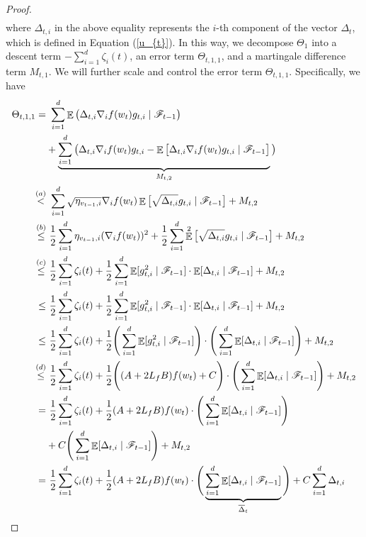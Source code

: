 \documentclass{article} %
\DeclareMathOperator{\Expect}{\mathbb{E}}
\begin{document}
\begin{proof}
\begin{align}
\end{align}
where $\Delta_{t,i}$ in the above equality represents the $i$-th component of the vector $\Delta_{t}$, which is defined in Equation (\ref{u_{t}}). In this way, we decompose $\Theta_{1}$ into a descent term $-\sum_{i=1}^{d}\zeta_{i}(t)$, an error term $\Theta_{t,1,1}$, and a martingale difference term $M_{t,1}$. We will further scale and control the error term $\Theta_{t,1,1}$. Specifically, we have
\begin{align}\label{adam_2}
\Theta_{t,1,1}=&\ \sum_{i=1}^{d}\Expect\big(\Delta_{t,i}\nabla_{i}f(w_{t})g_{t,i}\mid\mathscr{F}_{t-1}\big)\notag\\
&+\underbrace{\sum_{i=1}^{d}\big(\Delta_{t,i}\nabla_{i}f(w_{t})g_{t,i}-\Expect\big[\Delta_{t,i}\nabla_{i}f(w_{t})g_{t,i}\mid\mathscr{F}_{t-1}\big]}_{M_{t,2}}\big)\notag\\
\mathop{<}^{(a)}&\ \sum_{i=1}^{d}\sqrt{\eta_{v_{t-1},i}}\nabla_{i}f(w_{t})\Expect\big[\sqrt{\Delta_{t,i}}{g_{t,i}}\mid\mathscr{F}_{t-1}\big]+M_{t,2}\notag\\
\mathop{\le}^{(b)}&\  \frac{1}{2}\sum_{i=1}^{d}\eta_{v_{t-1},i}(\nabla_{i} f(w_{t}))^{2}+\frac{1}{2}\sum_{i=1}^{d}\Expect^{2}\big[\sqrt{\Delta_{t,i}}{g_{t,i}}\mid\mathscr{F}_{t-1}\big]+M_{t,2}\notag\\
\mathop{\le}^{(c)}&\  \frac{1}{2}\sum_{i=1}^{d}\zeta_{i}(t)+\frac{1}{2}\sum_{i=1}^{d}\Expect[g^{2}_{t,i}\mid\mathscr{F}_{t-1}]\cdot\Expect[\Delta_{t,i}\mid\mathscr{F}_{t-1}]+M_{t,2}\notag\\
\le&\  \frac{1}{2}\sum_{i=1}^{d}\zeta_{i}(t)+\frac{1}{2}\sum_{i=1}^{d}\Expect[g^{2}_{t,i}\mid\mathscr{F}_{t-1}]\cdot\Expect[\Delta_{t,i}\mid\mathscr{F}_{t-1}]+M_{t,2}\notag\\
\le&\ \frac{1}{2}\sum_{i=1}^{d}\zeta_{i}(t)+\frac{1}{2}\Bigg(\sum_{i=1}^{d}\Expect[g^{2}_{t,i}\mid\mathscr{F}_{t-1}]\Bigg)\cdot\Bigg(\sum_{i=1}^{d}\Expect[\Delta_{t,i}\mid \mathscr{F}_{t-1}]\Bigg)+M_{t,2}\notag\\
\mathop{\le}^{(d)}&\ \frac{1}{2}\sum_{i=1}^{d}\zeta_{i}(t)+\frac{1}{2}\Bigg((A+2L_{f}B)f(w_{t})+C\Bigg)\cdot\Bigg(\sum_{i=1}^{d}\Expect[\Delta_{t,i}\mid \mathscr{F}_{t-1}]\Bigg)+M_{t,2}\notag\\
=&\ \frac{1}{2}\sum_{i=1}^{d}\zeta_{i}(t)+\frac{1}{2}(A+2L_{f}B)f(w_{t})\cdot\Bigg(\sum_{i=1}^{d}\Expect[\Delta_{t,i}\mid \mathscr{F}_{t-1}]\Bigg)\notag\\
&+C\Bigg(\sum_{i=1}^{d}\Expect[\Delta_{t,i}\mid \mathscr{F}_{t-1}]\Bigg)+M_{t,2}\notag\\
=&\ \frac{1}{2}\sum_{i=1}^{d}\zeta_{i}(t)+\frac{1}{2}(A+2L_{f}B)f(w_{t})\cdot\Bigg(\underbrace{\sum_{i=1}^{d}\Expect[\Delta_{t,i}\mid \mathscr{F}_{t-1}]}_{\overline{\Delta}_{t}}\Bigg)+C\sum_{i=1}^{d}\Delta_{t,i}\notag\\

\end{align}
\end{proof}
\end{document}
